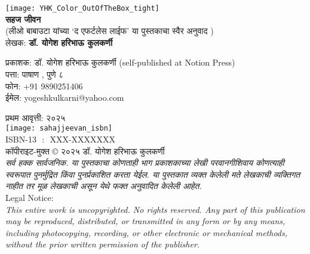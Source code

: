 \thispagestyle{empty}

\begin{center}
\texttt{[image: YHK\_Color\_OutOfTheBox\_tight]} \\[1.5em]

\textbf{\Huge सहज जीवन}\\ [0.5em]
{\small(लीओ बाबाउटा यांच्या `द एफर्टलेस लाईफ' या पुस्तकाचा स्वैर अनुवाद )}\\[0.5em]

लेखक: \textbf{{\large डॉ. योगेश हरिभाऊ कुलकर्णी}}\\[1.5em]
\end{center}

\vspace{1.5em}

\begin{flushleft}

प्रकाशक: डॉ. योगेश हरिभाऊ कुलकर्णी (self-published at Notion Press)\\
पत्ता:  पाषाण ,  पुणे ८ \\
फोन:  +91 9890251406\\
ईमेल: yogeshkulkarni@yahoo.com\\[1.5em]

\vspace{0.5em}

प्रथम आवृत्ती: २०२५\\[0.5em]

\texttt{[image: sahajjeevan\_isbn]} \\ [0.5em]
ISBN-13 ‏ : ‎ XXX-XXXXXXX\\[1.5em]

कॉपीराइट-मुक्त © २०२५ डॉ. योगेश हरिभाऊ कुलकर्णी\\[0.5em]

{\textit{सर्व हक्क सार्वजनिक. या पुस्तकाचा कोणताही भाग प्रकाशकाच्या लेखी परवानगीशिवाय कोणत्याही स्वरूपात पुनर्मुद्रित किंवा पुनर्प्रकाशित करता येईल.  या पुस्तकात व्यक्त केलेली मते लेखकाची व्यक्तिगत नाहीत तर मूळ लेखकाची असून येथे फक्त अनुवादित केलेली आहेत.}}\\[1.5em]

{\large Legal Notice:}\\
{\textit{This entire work is uncopyrighted. No rights reserved. Any part of this publication may be reproduced, distributed, or transmitted in any form or by any means, including photocopying, recording, or other electronic or mechanical methods, without the prior written permission of the publisher.}}
\end{flushleft}
\vfill\null
\clearpage

